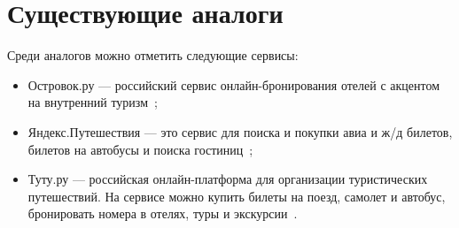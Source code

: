 \section{Существующие аналоги}
Среди аналогов можно отметить следующие сервисы:
\begin{itemize}
	\item Островок.ру --- российский сервис онлайн-бронирования отелей с акцентом на внутренний \mbox{туризм \cite{ostrovok};}
	
	\item Яндекс.Путешествия --- это сервис для поиска и покупки авиа и ж/д билетов, билетов на автобусы и поиска \mbox{гостиниц \cite{yandex};}
	
	\item Туту.ру --- российская онлайн-платформа для организации туристических путешествий. На сервисе можно купить билеты на поезд, самолет и автобус, бронировать номера в отелях, туры и \mbox{экскурсии \cite{tutu}.}
\end{itemize}